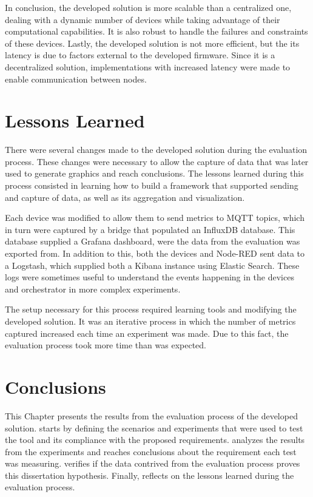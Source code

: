 In conclusion, the developed solution is more scalable than a centralized one, dealing with a dynamic number of devices while taking advantage of their computational capabilities. It is also robust to handle the failures and constraints of these devices. Lastly, the developed solution is not more efficient, but the its latency is due to factors external to the developed firmware. Since it is a decentralized solution, implementations with increased latency were made to enable communication between nodes.

\section{Lessons Learned}\label{sec:evaluation_lessons_learned}

There were several changes made to the developed solution during the evaluation process. These changes were necessary to allow the capture of data that was later used to generate graphics and reach conclusions. The lessons learned during this process consisted in learning how to build a framework that supported sending and capture of data, as well as its aggregation and visualization. 

Each device was modified to allow them to send metrics to MQTT topics, which in turn were captured by a bridge that populated an InfluxDB database. This database supplied a Grafana dashboard, were the data from the evaluation was exported from. In addition to this, both the devices and Node-RED sent data to a Logstash, which supplied both a Kibana instance using Elastic Search. These logs were sometimes useful to understand the events happening in the devices and orchestrator in more complex experiments.

The setup necessary for this process required learning tools and modifying the developed solution. It was an iterative process in which the number of metrics captured increased each time an experiment was made. Due to this fact, the evaluation process took more time than was expected.

\section{Conclusions}\label{sec:evaluation_conclusions}

This Chapter presents the results from the evaluation process of the developed solution.  starts by defining the scenarios and experiments that were used to test the tool and its compliance with the proposed requirements.  analyzes the results from the experiments and reaches conclusions about the requirement each test was measuring.  verifies if the data contrived from the evaluation process proves this dissertation hypothesis. Finally,  reflects on the lessons learned during the evaluation process. 

